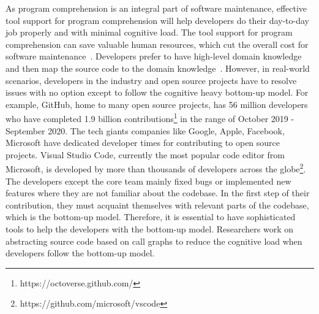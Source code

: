  As program comprehension is an integral part of software maintenance, effective tool support for program comprehension will help developers do their day-to-day job properly and with minimal cognitive load. The tool support for program comprehension can save valuable human resources, which cut the overall cost for software maintenance~\cite{kruger2019features}. Developers prefer to have high-level domain knowledge and then map the source code to the domain knowledge~\cite{brooks1983theoryComprehensionPrograms}. However, in real-world scenarios, developers in the industry and open source projects have to resolve issues with no option except to follow the cognitive heavy bottom-up model. For example, GitHub, home to many open source projects, has 56 million developers who have completed 1.9 billion contributions\footnote{https://octoverse.github.com/} in the range of October 2019 - September 2020. The tech giants companies like Google, Apple, Facebook, Microsoft have dedicated developer times for contributing to open source projects. Visual Studio Code, currently the most popular code editor from Microsoft, is developed by more than thousands of developers across the globe\footnote{https://github.com/microsoft/vscode}. The developers except the core team mainly fixed bugs or implemented new features where they are not familiar about the codebase. In the first step of their contribution, they must acquaint themselves with relevant parts of the codebase, which is the bottom-up model. Therefore, it is essential to have sophisticated tools to help the developers with the bottom-up model. Researchers work on abstracting source code based on call graphs to reduce the cognitive load when developers follow the bottom-up model. 


